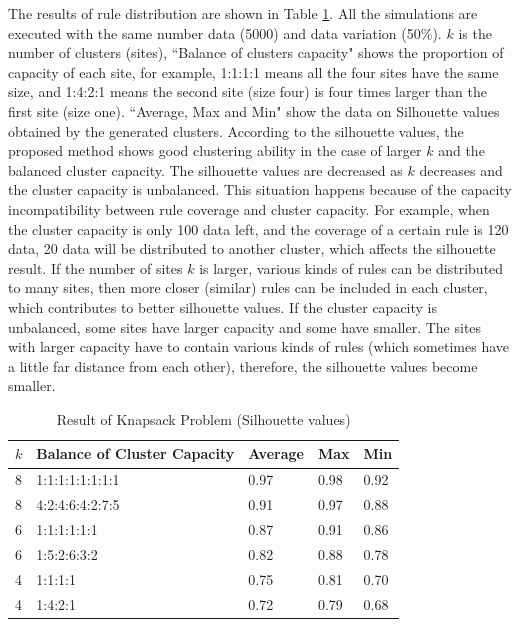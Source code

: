 \documentclass{elsart}
\begin{document}
The results of rule distribution are shown in Table \ref{knapsack-result}. All the simulations are executed with the same number data (5000) and data variation (50\%).
$k$ is the number of clusters (sites),
``Balance of clusters capacity" shows the proportion of capacity of each site, for example, 1:1:1:1 means all the four sites have the same size, and 1:4:2:1 means the second site (size four) is four times larger than the first site (size one).
``Average, Max and Min" show the data on Silhouette values obtained by the generated clusters. According to the silhouette values, the proposed method shows good clustering ability in the case of larger $k$ and the balanced cluster capacity. The silhouette values are decreased as $k$ decreases and the cluster capacity is unbalanced. This situation happens because of the capacity incompatibility between rule coverage and cluster capacity. For example, when the cluster capacity is only 100 data left, and the coverage of a certain rule is 120 data, 20 data will be distributed to another cluster, which affects the silhouette result. If the number of sites $k$ is larger, various kinds of rules can be distributed to many sites, then more closer (similar) rules can be included in each cluster, which contributes to better silhouette values.    
If the cluster capacity is unbalanced, some sites have larger capacity and some have smaller. The sites with larger capacity have to contain various kinds of rules (which sometimes have a little far distance from each other), therefore, the silhouette values become smaller.  

\begin{table}[tb]
\caption{\label{knapsack-result}Result of Knapsack Problem (Silhouette values)}
\begin{tabular}{|l|l|l|l|l|}
\hline 
$k$ & Balance of Cluster Capacity & Average & Max & Min\tabularnewline
\hline 
8 & 1:1:1:1:1:1:1:1 & 0.97 & 0.98 & 0.92\tabularnewline
\hline 
8 & 4:2:4:6:4:2:7:5 & 0.91 & 0.97 & 0.88\tabularnewline
\hline 
6 & 1:1:1:1:1:1 & 0.87 & 0.91 & 0.86\tabularnewline
\hline 
6 & 1:5:2:6:3:2 & 0.82 & 0.88 & 0.78\tabularnewline
\hline 
4 & 1:1:1:1 & 0.75 & 0.81 & 0.70\tabularnewline
\hline 
4 & 1:4:2:1 & 0.72 & 0.79 & 0.68\tabularnewline
\hline 
\end{tabular}
\end{table}
\end{document}

